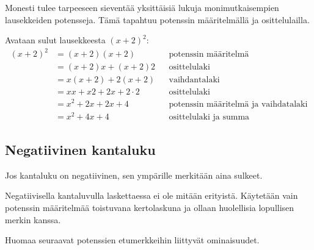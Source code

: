 Monesti tulee tarpeeseen sieventää yksittäisiä lukuja monimutkaisempien lausekkeiden potensseja. Tämä tapahtuu potenssin määritelmällä ja osittelulailla.
\begin{esimerkki}
 Avataan sulut lausekkeesta $(x+2)^2$:
	\begin{align*}
	(x+2)^2
	&=(x+2)(x+2) && \text{potenssin määritelmä} \\
	&=(x+2)x+(x+2)2 && \text{osittelulaki} \\
	&=x(x+2)+2(x+2) && \text{vaihdantalaki} \\
	&=xx+x2+2x+2\cdot2 && \text{osittelulaki} \\
	&=x^2+2x+2x+4 && \text{potenssin määritelmä ja vaihdatalaki} \\
	&=x^2+4x+4 && \text{osittelulaki ja summa}
	\end{align*}
\end{esimerkki} %


\subsection{Negatiivinen kantaluku}

Jos kantaluku on negatiivinen, sen ympärille merkitään aina sulkeet.

\begin{esimerkki}
\end{esimerkki}

Negatiivisella kantaluvulla laskettaessa ei ole mitään erityistä. Käytetään vain potenssin määritelmää toistuvana kertolaskuna ja ollaan huolellisia lopullisen merkin kanssa.
 
\begin{esimerkki}
\end{esimerkki}
    
Huomaa seuraavat potenssien etumerkkeihin liittyvät ominaisuudet.


